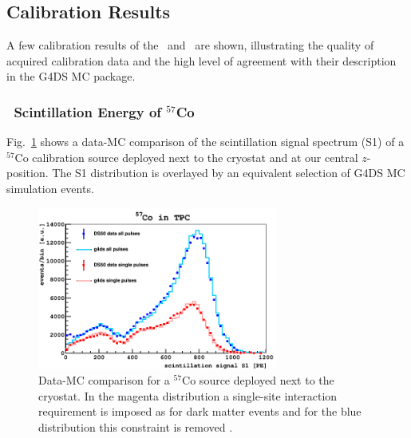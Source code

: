 

\subsection{Calibration Results}
A few calibration results of the \tpc\ and \lsv\ are shown, illustrating the quality of acquired calibration data and the high level of agreement with their description in the G4DS MC package.

\subsubsection{\tpc\ Scintillation Energy of $^{57}$Co}
Fig.~\ref{fig:CalibData:Co57} shows a data-MC comparison of the scintillation signal spectrum (S1) of a $^{57}$Co calibration source deployed next to the cryostat and at our central $z$-position. The S1 distribution is overlayed by an equivalent selection of G4DS MC simulation events.

\begin{figure}[htbp]
\centering
\includegraphics[width=0.7\textwidth]{./Figures/Co57_TPC.png}
\caption{Data-MC comparison for a $^{57}$Co source deployed next to the cryostat. In the magenta distribution a single-site interaction requirement is imposed as for dark matter events and for the blue distribution this constraint is removed \cite{DS50:G4DS:paper}.
\label{fig:CalibData:Co57}}
 \end{figure}

